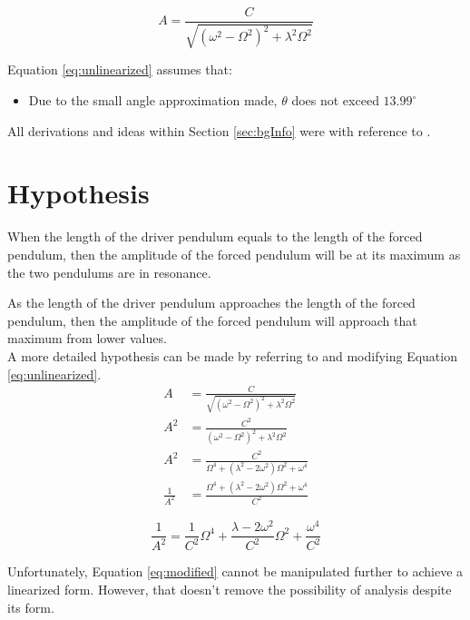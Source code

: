 \documentclass[letterpaper, 12pt]{article}
\begin{document}
\begin{equation} \label{eq:unlinearized}
    A = \frac{C}{\sqrt{(\omega^2 - \Omega^2)^2 + \lambda^2\Omega^2}}
\end{equation}

Equation \ref*{eq:unlinearized} assumes that:
\begin{itemize}
    \item Due to the small angle approximation made, \(\theta\) does not exceed \(13.99^{\circ}\)
\end{itemize}

All derivations and ideas within Section \ref*{sec:bgInfo} were with reference to \cite{chasnov11DampedDriven2022}.

\section{Hypothesis}

When the length of the driver pendulum equals to the length of the forced pendulum,
then the amplitude of the forced pendulum will be at its maximum as the two pendulums
are in resonance.

As the length of the driver pendulum approaches the length of the forced pendulum,
then the amplitude of the forced pendulum will approach that maximum from lower values.
\\

A more detailed hypothesis can be made by referring to and modifying Equation \ref*{eq:unlinearized}.
\begin{align*}
    A             & = \frac{C}{\sqrt{(\omega^2 - \Omega^2)^2 + \lambda^2\Omega^2}}
    \\
    A^2           & = \frac{C^2}{(\omega^2 - \Omega^2)^2 + \lambda^2\Omega^2}
    \\
    A^2           & = \frac{C^2}{\Omega^4 + (\lambda^2 - 2\omega^2)\Omega^2 + \omega^4}
    \\
    \frac{1}{A^2} & = \frac{\Omega^4 + (\lambda^2 - 2\omega^2)\Omega^2 + \omega^4}{C^2}
\end{align*}

\begin{equation} \label{eq:modified}
    \frac{1}{A^2} = \frac{1}{C^2}\Omega^4 + \frac{\lambda - 2\omega^2}{C^2}\Omega^2 + \frac{\omega^4}{C^2}
\end{equation}

Unfortunately, Equation \ref*{eq:modified} cannot be manipulated further
to achieve a linearized form. However, that doesn't remove
the possibility of analysis despite its form.
\end{document}
